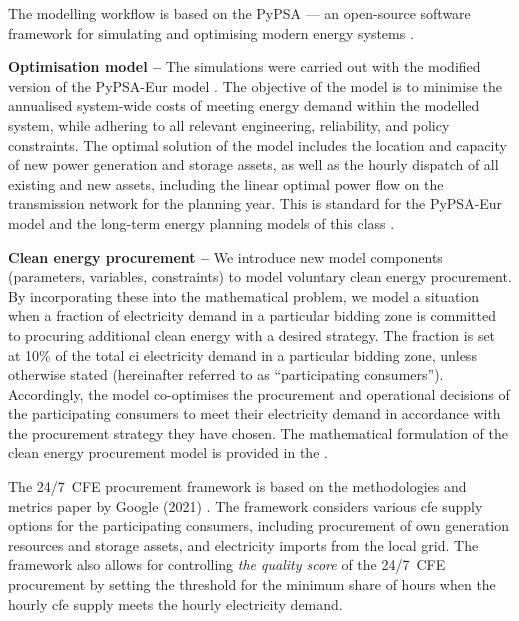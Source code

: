 The modelling workflow is based on the PyPSA --- an open-source software framework for simulating and optimising modern energy systems \cite{brownPyPSAPythonPower2018}. 

\textbf{Optimisation model --} The simulations were carried out with the modified version of the PyPSA-Eur model \cite{PyPSA-Eur-github}. 
The objective of the model is to minimise the annualised system-wide costs of meeting energy demand within the modelled system, while adhering to all relevant engineering, reliability, and policy constraints.
The optimal solution of the model includes the location and capacity of new power generation and storage assets, as well as the hourly dispatch of all existing and new assets, including the linear optimal power flow on the transmission network for the planning year. This is standard for the PyPSA-Eur model \cite{horschPyPSAEurOpenOptimisation2018} and the long-term energy planning models of this class \cite{jenkinsGenX2022, howellsOSeMOSYSOpenSource2011}.

\textbf{Clean energy procurement --} We introduce new model components (parameters, variables, constraints) to model voluntary clean energy procurement.
By incorporating these into the mathematical problem, we model a situation when a fraction of electricity demand in a particular bidding zone is committed to procuring additional clean energy with a desired strategy.
The fraction is set at 10\% of the total \gls{ci} electricity demand in a particular bidding zone, unless otherwise stated (hereinafter referred to as \enquote{participating consumers}).
Accordingly, the model co-optimises the procurement and operational decisions of the participating consumers to meet their electricity demand in accordance with the procurement strategy they have chosen.
The mathematical formulation of the clean energy procurement model is provided in the .

The 24/7~CFE procurement framework is based on the methodologies and metrics paper by Google (2021) \cite{google-methodologies}.
The framework considers various \gls{cfe} supply options for the participating consumers, including procurement of own generation resources and storage assets, and electricity imports from the local grid.
The framework also allows for controlling \textit{the quality score} of the 24/7~CFE procurement by setting the threshold for the minimum share of hours when the hourly \gls{cfe} supply meets the hourly electricity demand. 

